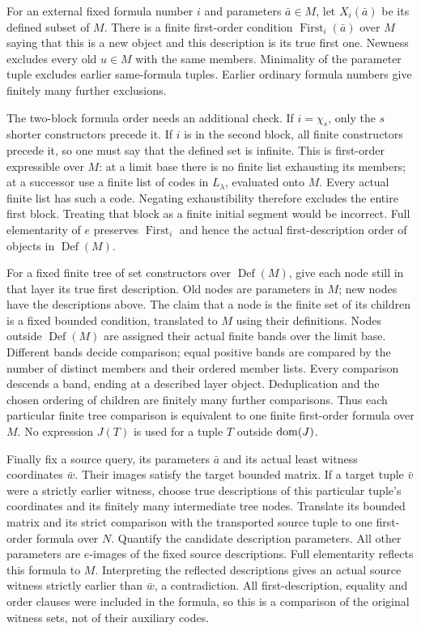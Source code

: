 For an external fixed formula number $i$ and parameters $\bar a\in M$,
let $X_i(\bar a)$ be its defined subset of $M$. There is a finite
first-order condition $\operatorname{First}_i(\bar a)$ over $M$ saying
that this is a new object and this description is its true first one.
Newness excludes every old $u\in M$ with the same members. Minimality
of the parameter tuple excludes earlier same-formula tuples. Earlier
ordinary formula numbers give finitely many further exclusions.

The two-block formula order needs an additional check. If $i=\chi_s$,
only the $s$ shorter constructors precede it. If $i$ is in the second
block, all finite constructors precede it, so one must say that the
defined set is infinite. This is first-order expressible over $M$:
at a limit base there is no finite list exhausting its members; at a
successor use a finite list of codes in $L_\lambda$, evaluated onto $M$.
Every actual finite list has such a code. Negating exhaustibility
therefore excludes the entire first block. Treating that block as a
finite initial segment would be incorrect. Full elementarity of $e$
preserves $\operatorname{First}_i$ and hence the actual first-description
order of objects in $\operatorname{Def}(M)$.

For a fixed finite tree of set constructors over $\operatorname{Def}(M)$,
give each node still in that layer its true first description. Old nodes
are parameters in $M$; new nodes have the descriptions above. The claim
that a node is the finite set of its children is a fixed bounded
condition, translated to $M$ using their definitions. Nodes outside
$\operatorname{Def}(M)$ are assigned their actual finite bands over the
limit base. Different bands decide comparison; equal positive bands
are compared by the number of distinct members and their ordered member
lists. Every comparison descends a band, ending at a described layer
object. Deduplication and the chosen ordering of children are finitely
many further comparisons. Thus each particular finite tree comparison
is equivalent to one finite first-order formula over $M$. No expression
$J(T)$ is used for a tuple $T$ outside $\operatorname{dom}(J)$.

Finally fix a source query, its parameters $\bar a$ and its actual
least witness coordinates $\bar w$. Their images satisfy the target
bounded matrix. If a target tuple $\bar v$ were a strictly earlier
witness, choose true descriptions of this particular tuple's coordinates
and its finitely many intermediate tree nodes. Translate its bounded
matrix and its strict comparison with the transported source tuple to
one first-order formula over $N$. Quantify the candidate description
parameters. All other parameters are $e$-images of the fixed source
descriptions. Full elementarity reflects this formula to $M$.
Interpreting the reflected descriptions gives an actual source witness
strictly earlier than $\bar w$, a contradiction. All first-description,
equality and order clauses were included in the formula, so this is a
comparison of the original witness sets, not of their auxiliary codes.

